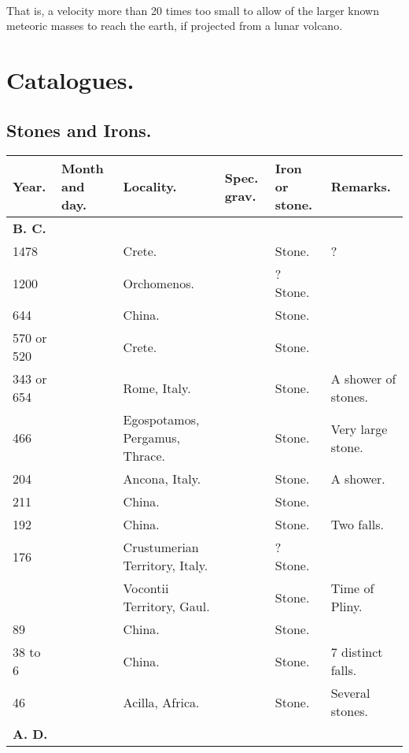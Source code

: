 \documentclass[a4paper, 12pt, oneside]{article}
\begin{document}
\paragraph{}
That is, a velocity more than 20 times too small to allow of the larger known meteoric masses to reach the earth, if projected from a lunar volcano.
\clearpage
\section{Catalogues.}
\subsection{Stones and Irons.}
\begin{center}
    \footnotesize
    \begin{longtable}{|p{10mm}|p{15mm}|p{32mm}|p{13mm}|p{13mm}|p{26mm}|}
    \hline
        Year. & Month and day. & Locality. & Spec. grav. & Iron or stone. & Remarks. \\ \hline
        \textbf{B. C.} & ~ & ~ & ~ & ~ & ~ \\
        1478 & ~ & Crete. & ~ & Stone. & ? \\
        1200 & ~ & Orchomenos. & ~ & ? Stone. & ~ \\
        644 & ~ & China. & ~ & Stone. & ~ \\
        570 or 520 & ~ & Crete. & ~ & Stone. & ~ \\
        343 or 654 & ~ & Rome, Italy. & ~ & Stone. & A shower of stones. \\
        466 & ~ & Egospotamos, Pergamus, Thrace. & ~ & Stone. & Very large stone. \\
        204 & ~ & Ancona, Italy. & ~ & Stone. & A shower. \\
        211 & ~ & China. & ~ & Stone. & ~ \\
        192 & ~ & China. & ~ & Stone. & Two falls. \\
        176 & ~ & Crustumerian Territory, Italy. & ~ & ? Stone. & ~ \\
        ~ & ~ & Vocontii Territory, Gaul. & ~ & Stone. & Time of Pliny. \\
        89 & ~ & China. & ~ & Stone. & ~ \\
        38 to 6 & ~ & China. & ~ & Stone. & 7 distinct falls. \\
        46 & ~ & Acilla, Africa. & ~ & Stone. & Several stones. \\
        \textbf{A. D.} & ~ & ~ & ~ & ~ & ~ \\

\end{longtable}
\end{center}
\end{document}
